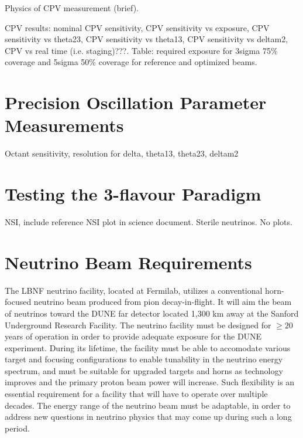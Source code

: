Physics of CPV measurement (brief).

CPV results: nominal CPV sensitivity, CPV sensitivity vs exposure, CPV sensitivity vs theta23, CPV sensitivity vs theta13, CPV sensitivity vs deltam2, CPV vs real time (i.e. staging)???. Table: required exposure for 3sigma 75\% coverage and 5sigma 50\% coverage for reference and optimized beams.



\section{Precision Oscillation Parameter Measurements}

Octant sensitivity, resolution for delta, theta13, theta23, deltam2

\section{Testing the 3-flavour Paradigm}
\label{sec:physics-lbnosc-3nutests}

NSI, include reference NSI plot in science document.  Sterile neutrinos.  No plots.

\section{Neutrino Beam Requirements}
\label{sec:physics-lbnosc-beam-req}
The LBNF neutrino facility, located at Fermilab, utilizes a conventional horn-focused neutrino beam produced from pion decay-in-flight. It will aim the beam of neutrinos toward
the DUNE far detector located 1,300 km away at the Sanford Underground Research Facility. The neutrino facility must be designed for $\ge 20$ years of operation in order to provide adequate exposure for the DUNE experiment. During its lifetime, the facility must be able to accomodate various target and focusing configurations to enable tunability 
in the neutrino energy spectrum, and must be suitable for upgraded targets and horns as technology improves and the primary proton beam power will increase. Such
flexibility is an essential requirement for a facility that will have to operate over multiple decades. The energy range of the neutrino beam must be adaptable, in order to address new questions in neutrino physics that may come up during such a long period.


